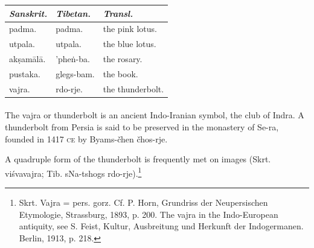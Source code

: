 \documentclass[a4paper, 12pt, oneside]{article}
\begin{document}
\begin{table}[H]
    \centering
    \small
    \bfseries
    \begin{tabular}{l l l}
   
        \emph{Sanskrit.}  &  \emph{Tibetan.}    &  \emph{Transl.}           \\ \hline
         padma.     &  padma.      &  the pink lotus.   \\
         utpala.    &  utpala.     &  the blue lotus.   \\
         ak\d{s}am\={a}l\={a}.  &  'phe\.{n}-ba.   &  the rosary.       \\
         pustaka.   &  glegs-bam.  &  the book.         \\
         vajra.     &  rdo-rje.    &  the thunderbolt. \\
    \end{tabular}
\end{table}
\paragraph{}
The vajra or thunderbolt is an ancient Indo-Iranian symbol, the club of Indra. A thunderbolt from Persia is said to be preserved in the monastery of Se-ra, founded in 1417 \textsc{ce} by Byams-čhen čhos-rje.

A quadruple form of the thunderbolt is frequently met on images (Skrt. vi\'{s}vavajra; Tib. sNa-tshogs rdo-rje).\footnote{Skrt. Vajra = pers. gorz. Cf. P. Horn, Grundriss der Neupersischen Etymologie, Strassburg, 1893, p. 200. The vajra in the Indo-European antiquity, see S. Feist, Kultur, Ausbreitung und Herkunft der Indogermanen. Berlin, 1913, p. 218.}
\end{document}
